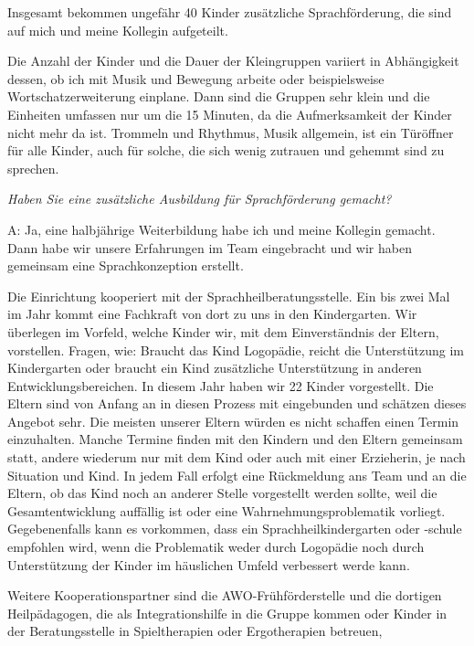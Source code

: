 \begin{linenumbers*}
Insgesamt bekommen ungefähr 40 Kinder zusätzliche Sprachförderung, die sind auf mich und meine Kollegin aufgeteilt. 

Die Anzahl der Kinder und die Dauer der Kleingruppen variiert in Abhängigkeit dessen, ob ich mit Musik und Bewegung arbeite oder beispielsweise Wortschatzerweiterung einplane. Dann sind die Gruppen sehr klein und die Einheiten umfassen nur um die 15 Minuten, da die Aufmerksamkeit der Kinder nicht mehr da ist. Trommeln und Rhythmus, Musik allgemein, ist ein Türöffner für alle Kinder, auch für solche, die sich wenig zutrauen und gehemmt sind zu sprechen. 

\emph{Haben Sie eine zusätzliche Ausbildung für Sprachförderung gemacht?}
 
A: Ja, eine halbjährige Weiterbildung habe ich und meine Kollegin gemacht. Dann habe wir unsere Erfahrungen im Team eingebracht und wir haben gemeinsam eine Sprachkonzeption erstellt.

Die Einrichtung kooperiert mit der Sprachheilberatungsstelle. Ein bis zwei Mal im Jahr kommt eine Fachkraft von dort zu uns in den Kindergarten. Wir überlegen im Vorfeld, welche Kinder wir, mit dem Einverständnis der Eltern, vorstellen. Fragen, wie: Braucht das Kind Logopädie, reicht die Unterstützung im Kindergarten oder braucht ein Kind zusätzliche Unterstützung in anderen Entwicklungsbereichen. In diesem Jahr haben wir 22 Kinder vorgestellt. 
Die Eltern sind von Anfang an in diesen Prozess mit eingebunden und schätzen dieses Angebot sehr.
 Die meisten unserer Eltern würden es nicht schaffen einen Termin einzuhalten. Manche Termine finden mit den Kindern und den Eltern gemeinsam statt, andere wiederum nur mit dem Kind oder auch mit einer Erzieherin, je nach Situation und Kind. In jedem Fall erfolgt eine Rückmeldung ans Team und an die Eltern, ob das Kind noch an anderer Stelle vorgestellt werden sollte, weil die Gesamtentwicklung auffällig ist oder eine Wahrnehmungsproblematik vorliegt. 
Gegebenenfalls kann es vorkommen, dass ein Sprachheilkindergarten oder -schule empfohlen wird, wenn die Problematik weder durch Logopädie noch durch Unterstützung der Kinder im häuslichen Umfeld verbessert werde kann. 

Weitere Kooperationspartner sind die AWO-Frühförderstelle und die dortigen Heilpädagogen, die als Integrationshilfe in die Gruppe kommen oder Kinder in der Beratungsstelle in Spieltherapien oder Ergotherapien betreuen, 


\end{linenumbers*}
